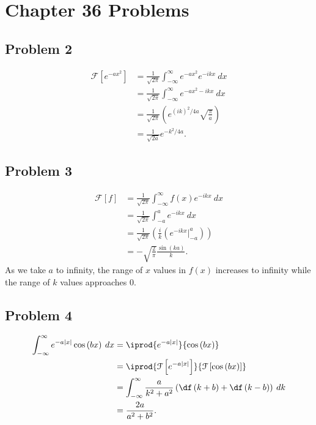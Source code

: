 \documentclass[10pt]{mypackage}
\begin{document}
\RaggedRight
\section{Chapter 36 Problems}%
\subsection{Problem 2}%
\begin{align*}
  \mathcal{F}\left[e^{-ax^2}\right] &= \frac{1}{\sqrt{2\pi}}\int_{-\infty}^{\infty} e^{-ax^2}e^{-ikx}\:dx\\
                                    &= \frac{1}{\sqrt{2\pi}}\int_{-\infty}^{\infty} e^{-ax^2-ikx}\:dx\\
                                    &= \frac{1}{\sqrt{2\pi}}\left(e^{\left(ik\right)^2/4a}\sqrt{\frac{\pi}{a}}\right)\\
                                    &= \frac{1}{\sqrt{2a}}e^{-k^2/4a}.
\end{align*}
\subsection{Problem 3}%
\begin{align*}
  \mathcal{F}\left[f\right] &= \frac{1}{\sqrt{2\pi}}\int_{-\infty}^{\infty} f(x)e^{-ikx}\:dx\\
                            &= \frac{1}{\sqrt{2\pi}}\int_{-a}^{a} e^{-ikx}\:dx\\
                            &= \frac{1}{\sqrt{2\pi}}\left(\frac{i}{k}\left(e^{-ikx}\bigr\vert_{-a}^{a}\right)\right)\\
                            &= -\sqrt{\frac{2}{\pi}}\frac{\sin\left(ka\right)}{k}.
\end{align*}
As we take $a$ to infinity, the range of $x$ values in $f(x)$ increases to infinity while the range of $k$ values approaches $0$.
\subsection{Problem 4}%
\begin{align*}
  \int_{-\infty}^{\infty} e^{-a|x|}\cos\left(bx\right)\:dx &= \iprod{e^{-a|x|}}{\cos\left(bx\right)}\\
                                                           &= \iprod{\mathcal{F}\left[e^{-a|x|}\right]}{\mathcal{F}\left[\cos\left(bx\right)\right]}\\
                                                           &= \int_{-\infty}^{\infty} \frac{a}{k^2 + a^2}\left(\df\left(k+b\right)+\df\left(k-b\right)\right)\:dk\\
                                                           &= \frac{2a}{a^2 + b^2}.
\end{align*}
\end{document}
